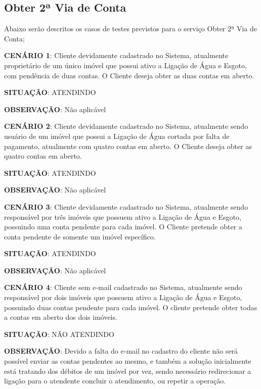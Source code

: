 \subsection{Obter 2ª Via de Conta}
Abaixo serão descritos os casos de testes previstos para o serviço Obter 2ª Via de Conta;
\begin{flushleft}
\begin{description}
\item \textbf{CENÁRIO 1}: Cliente devidamente cadastrado no Sistema, atualmente proprietário de um único imóvel que possui ativo a Ligação de Água e Esgoto, com pendência de duas contas. O Cliente deseja obter as duas contas em aberto.
\item \textbf{SITUAÇÃO}: ATENDINDO
\item \textbf{OBSERVAÇÃO}: Não aplicável
\end{description}

\begin{description}
\item \textbf{CENÁRIO 2}: Cliente devidamente cadastrado no Sistema, atualmente sendo usuário de um imóvel que possui a Ligação de Água cortada por falta de pagamento, atualmente com quatro contas em aberto. O Cliente deseja obter as quatro contas em aberto.
\item \textbf{SITUAÇÃO}: ATENDINDO
\item \textbf{OBSERVAÇÃO}: Não aplicável
\end{description}

\begin{description}
\item \textbf{CENÁRIO 3}: Cliente devidamente cadastrado no Sistema, atualmente sendo responsável por três imóveis que possuem ativo a Ligação de Água e Esgoto, possuindo uma conta pendente para cada imóvel. O Cliente pretende obter a conta pendente de somente um imóvel específico. 
\item \textbf{SITUAÇÃO}: ATENDINDO
\item \textbf{OBSERVAÇÃO}: Não aplicável
\end{description}

\begin{description}
\item \textbf{CENÁRIO 4}: Cliente sem e-mail cadastrado no Sistema, atualmente sendo responsável por dois imóveis que possuem ativo a Ligação de Água e Esgoto, possuindo duas contas pendente para cada imóvel.  O cliente pretende obter todas a contas em aberto dos dois imóveis. 
\item \textbf{SITUAÇÃO}: NÃO ATENDINDO
\item \textbf{OBSERVAÇÃO}: Devido a falta do e-mail no cadastro do cliente não será possível enviar as contas pendentes ao mesmo, e também a solução inicialmente está tratando dos débitos de um imóvel por vez, sendo necessário redirecionar a ligação para o atendente concluir o atendimento, ou repetir a operação.
\end{description}
\end{flushleft}


